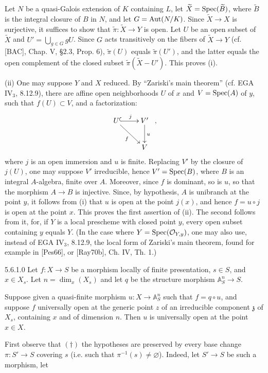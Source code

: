Let $N$ be a quasi-Galois extension of $K$ containing $L$, let $\widetilde X=\operatorname{Spec}(\widetilde B)$, where $\widetilde B$ is the integral closure of $B$ in $N$, and let $G=\operatorname{Aut}(N/K)$. Since $\widetilde X\to X$ is surjective, it suffices to show that $\widetilde\pi:\widetilde X\to Y$ is open. Let $U$ be an open subset of $\widetilde X$ and $U'=\bigcup_{g\in G}gU$. Since $G$ acts transitively on the fibers of $\widetilde X\to Y$ (cf. [BAC], Chap. V, §2.3, Prop. 6), $\widetilde\pi(U)$ equals $\widetilde\pi(U')$, and the latter equals the open complement of the closed subset $\widetilde\pi(\widetilde X-U')$. This proves (i).

(ii) One may suppose $Y$ and $X$ reduced. By ``Zariski's main theorem'' (cf. EGA IV$_3$, 8.12.9), there are affine open neighborhoods $U$ of $x$ and $V=\operatorname{Spec}(A)$ of $y$, such that $f(U)\subset V$, and a factorization:
\[
\xymatrix{U\ar@{^{(}->}[r]^j\ar[dr]_f&V'\ar[d]^u\\&V}\ ,
\]
where $j$ is an open immersion and $u$ is finite. Replacing $V'$ by the closure of $j(U)$, one may suppose $V'$ irreducible, hence $V'=\operatorname{Spec}(B)$, where $B$ is an integral $A$-algebra, finite over $A$. Moreover, since $f$ is dominant, so is $u$, so that the morphism $A\to B$ is injective. Since, by hypothesis, $A$ is unibranch at the point $y$, it follows from (i) that $u$ is open at the point $j(x)$, and hence $f=u\circ j$ is open at the point $x$. This proves the first assertion of (ii). The second follows from it, for, if $Y$ is a local prescheme with closed point $y$, every open subset containing $y$ equals $Y$. (In the case where $Y=\operatorname{Spec}(\mathcal{O}_{Y,y})$, one may also use, instead of EGA IV$_3$, 8.12.9, the local form of Zariski's main theorem, found for example in [Pes66], or [Ray70b], Ch. IV, Th. 1.)
\begin{lemma}{5.6.1.0}\label{VIB.5.6.1.0}
Let $f:X\to S$ be a morphism locally of finite presentation, $s\in S$, and $x\in X_s$. Let $n=\dim_x(X_s)$ and let $q$ be the structure morphism $\mathbb A_S^n\to S$.

Suppose given a quasi-finite morphism $u:X\to\mathbb A_S^n$ such that $f=q\circ u$, and suppose $f$ universally open at the generic point $z$ of an irreducible component $\mathfrak z$ of $X_s$, containing $x$ and of dimension $n$. Then $u$ is universally open at the point $x\in X$.
\end{lemma}
First observe that $(\dagger)$ the hypotheses are preserved by every base change $\pi:S'\to S$ covering $s$ (i.e. such that $\pi^{-1}(s)\ne\varnothing$). Indeed, let $S'\to S$ be such a morphism, let
